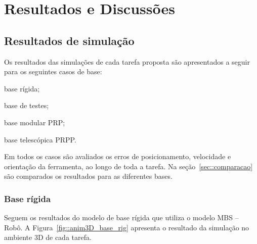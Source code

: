 \chapter{Resultados e Discussões} \label{cap::resultados}



\section{Resultados de simulação} \label{sec::resultados}

Os resultados das simulações de cada tarefa proposta são apresentados a seguir
para os seguintes casos de base:
%
\begin{enumerate*}[label=\emph{\roman*})]
	\item base rígida;
	\item base de testes;
	\item base modular PRP;
	\item base telescópica PRPP.
\end{enumerate*}
%

Em todos os casos são avaliados os erros de posicionamento, velocidade e
orientação da ferramenta, ao longo de toda a tarefa. Na
seção~\ref{sec::comparacao} são comparados os resultados para as diferentes
bases.

\subsection{Base rígida} \label{sec::res_rigida}

Seguem os resultados do modelo de base rígida que utiliza o modelo MBS --
Robô.
A Figura~\ref{fig::anim3D_base_rig} apresenta o resultado da simulação no ambiente
3D de cada tarefa.

